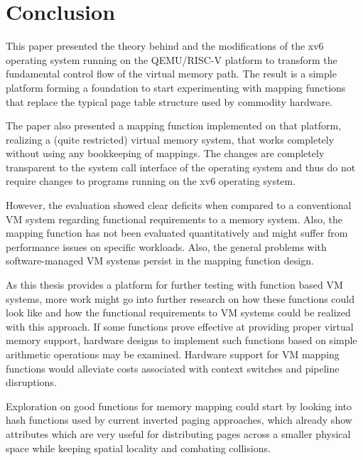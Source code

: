 \chapter{Conclusion}

\label{chap:conclusion}



This paper presented the theory behind and the modifications of the xv6 operating system running on the QEMU/RISC-V platform to transform the fundamental control flow of the virtual memory path. The result is a simple platform forming a foundation to start experimenting with mapping functions that replace the typical page table structure used by commodity hardware.

The paper also presented a mapping function implemented on that platform, realizing a (quite restricted) virtual memory system, that works completely without using any bookkeeping of mappings. The changes are completely transparent to the system call interface of the operating system and thus do not require changes to programs running on the xv6 operating system.

However, the evaluation showed clear deficits when compared to a conventional VM system regarding functional requirements to a memory system. Also, the mapping function has not been evaluated quantitatively and might suffer from performance issues on specific workloads. Also, the general problems with software-managed VM systems persist in the mapping function design.

As this thesis provides a platform for further testing with function based VM systems, more work might go into further research on how these functions could look like and how the functional requirements to VM systems could be realized with this approach. If some functions prove effective at providing proper virtual memory support, hardware designs to implement such functions based on simple arithmetic operations may be examined. Hardware support for VM mapping functions would alleviate costs associated with context switches and pipeline disruptions.

Exploration on good functions for memory mapping could start by looking into hash functions used by current inverted paging approaches, which already show attributes which are very useful for distributing pages across a smaller physical space while keeping spatial locality and combating collisions.